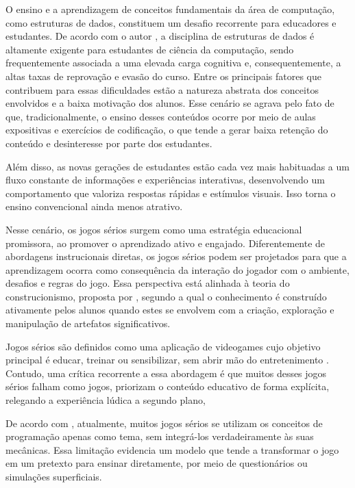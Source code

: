 O ensino e a aprendizagem de conceitos fundamentais da área de computação, como
estruturas de dados, constituem um desafio recorrente para educadores e
estudantes. De acordo com o autor , a
disciplina de estruturas de dados é altamente exigente para estudantes de
ciência da computação, sendo frequentemente associada a uma elevada carga
cognitiva e, consequentemente, a altas taxas de reprovação e evasão do curso.
Entre os principais fatores que contribuem para essas dificuldades estão a
natureza abstrata dos conceitos envolvidos e a baixa motivação dos alunos. Esse
cenário se agrava pelo fato de que, tradicionalmente, o ensino desses conteúdos
ocorre por meio de aulas expositivas e exercícios de codificação, o que tende a
gerar baixa retenção do conteúdo e desinteresse por parte dos estudantes.

Além disso, as novas gerações de estudantes estão cada vez mais habituadas a um
fluxo constante de informações e experiências interativas, desenvolvendo um
comportamento que valoriza respostas rápidas e estímulos visuais. Isso torna o
ensino convencional ainda menos atrativo. 

Nesse cenário, os jogos sérios surgem como uma estratégia educacional
promissora, ao promover o aprendizado ativo e engajado. Diferentemente de
abordagens instrucionais diretas, os jogos sérios podem ser projetados para que
a aprendizagem ocorra como consequência da interação do jogador com o ambiente,
desafios e regras do jogo. Essa perspectiva está alinhada à teoria do
construcionismo, proposta por , segundo a qual o
conhecimento é construído ativamente pelos alunos quando estes se envolvem com
a criação, exploração e manipulação de artefatos significativos.

Jogos sérios são definidos como uma aplicação de videogames cujo objetivo
principal é educar, treinar ou sensibilizar, sem abrir mão do entretenimento
\cite{mouaheb2012serious}. Contudo, uma crítica recorrente a essa abordagem é
que muitos desses jogos sérios falham como jogos, priorizam o conteúdo educativo de
forma explícita, relegando a experiência lúdica a segundo plano, 

De acordo com , atualmente, muitos jogos sérios se
utilizam os conceitos de programação apenas como tema, sem integrá-los
verdadeiramente às suas mecânicas. Essa limitação evidencia um modelo que tende
a transformar o jogo em um pretexto para ensinar diretamente, por meio de
 questionários ou simulações superficiais.

